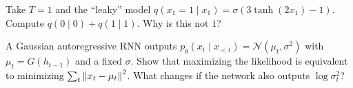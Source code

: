 \begin{notechapter}
\begin{exercise}\label{sequence-models:exr:4}
Take $T = 1$ and the ``leaky'' model $q(x_1 = 1\mid x_1) = \sigma(3\tanh(2x_1) - 1)$. Compute $q(0\mid 0) + q(1\mid 1)$. Why is this
not $1$?
\end{exercise}

\begin{exercise}\label{sequence-models:exr:5}
A Gaussian autoregressive RNN outputs $p_\theta(x_t\mid x_{<t}) = \mathcal N(\mu_t, \sigma^2)$ with $\mu_t = G(h_{t-1})$ and a fixed $\sigma$.
Show that maximizing the likelihood is equivalent to minimizing $\sum_t\left\|x_t - \mu_t\right\|^2$. What changes if the
network also outputs $\log\sigma_t^2$?
\end{exercise}
\end{notechapter}
